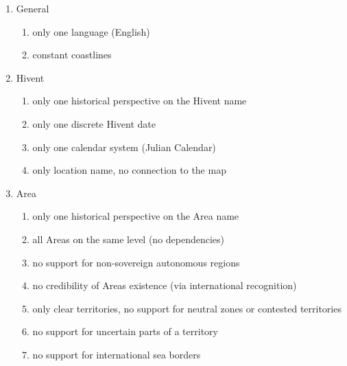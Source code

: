 \begin{enumerate}
  \item General
  \begin{enumerate}
    \item only one language (English)
    \label{problem_general_multilang}
    \item constant coastlines
    \label{problem_general_coastlines}
  \end{enumerate}
  \item Hivent
  \begin{enumerate}
    \item only one historical perspective on the Hivent name
    \label{problem_hivent_perspective}
    \item only one discrete Hivent date
    \label{problem_hivent_dates}
    \item only one calendar system (Julian Calendar)
    \label{problem_hivent_calendar}
    \item only location name, no connection to the map
    \label{problem_hivent_location}
  \end{enumerate}
  \item Area
  \begin{enumerate}
    \item only one historical perspective on the Area name
    \label{problem_area_perspective}
    \item all Areas on the same level (no dependencies)
    \label{problem_area_levels}
    \item no support for non-sovereign autonomous regions
    \label{problem_area_autonomy}
    \item no credibility of Areas existence (via international recognition)
    \label{problem_area_recognition}
    \item only clear territories, no support for neutral zones or contested territories
    \label{problem_area_territory}
    \item no support for uncertain parts of a territory
    \label{problem_area_territory_certainty}
    \item no support for international sea borders
    \label{problem_area_territory_sea_borders}
  \end{enumerate}
\end{enumerate}

